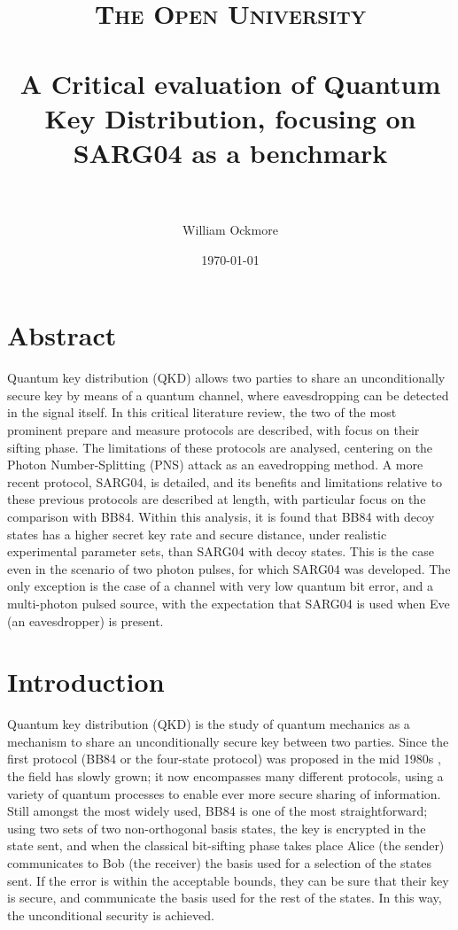 \documentclass[paper=a4, fontsize=11pt]{scrartcl} %
\title{
\normalfont \normalsize
\textsc{The Open University} \\ [25pt] %
\horrule{0.5pt} \\[0.4cm] %
\huge A Critical evaluation of Quantum Key Distribution, focusing on SARG04 as a benchmark \\ %
\horrule{2pt} \\[0.5cm] %
}
\author{William Ockmore} %
\date{\normalsize\today} %
\numberwithin{equation}{section} %
\numberwithin{figure}{section} %
\numberwithin{table}{section} %
\newcommand{\secstar}[1]{\addcontentsline{toc}{section}{#1}\section*{#1}}
\begin{document}
\maketitle %


\secstar{Abstract}
Quantum key distribution (QKD) allows two parties to share an unconditionally secure key by
means of a quantum channel, where eavesdropping can be detected in the signal itself.
In this critical literature review, the two of the most prominent prepare and measure protocols are
described, with focus on their sifting phase. The limitations of these protocols are analysed,
centering on the Photon Number-Splitting (PNS) attack as an eavedropping method.
A more recent protocol, SARG04, is detailed, and its benefits and limitations relative to
these previous protocols are described at length, with particular focus on the comparison with BB84.
Within this analysis, it is found that BB84 with decoy states has a higher secret key rate and secure
distance, under realistic experimental parameter sets, than SARG04 with decoy states. This is the case
even in the scenario of two photon pulses, for which SARG04 was developed. The only exception
is the case of a channel with very low quantum bit error, and a multi-photon pulsed source,
with the expectation that SARG04 is used when Eve (an eavesdropper) is present.



\clearpage
{}
\tableofcontents

\clearpage
\section{Introduction}

Quantum key distribution (QKD) is the study of quantum mechanics
as a mechanism to share an unconditionally secure key between two parties. Since the first
protocol (BB84 or the four-state protocol) was proposed in the mid 1980s \citep{BB84},
the field has slowly grown; it now encompasses many different
protocols, using a variety of quantum processes to enable ever more secure
sharing of information. Still amongst the most widely
used, BB84 is one of the most straightforward; using two sets of two non-orthogonal basis states,
the key is encrypted in the state sent, and when the classical bit-sifting phase
takes place Alice (the sender) communicates to Bob (the receiver) the basis used for a selection
of the states sent. If the error is within the acceptable bounds, they can be sure that
their key is secure, and communicate the basis used for the rest of the states. In this
way, the unconditional security is achieved.
\end{document}
